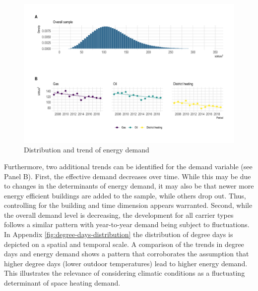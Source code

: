 \documentclass[12pt,twoside]{reedthesis}
\begin{document}
\begin{figure}

{\centering \includegraphics[width=1\linewidth]{figure/demand_descriptive} 

}

\caption{Distribution and trend of energy demand}\label{fig:demand-descriptive-graph}
\end{figure}
Furthermore, two additional trends can be identified for the demand variable (see Panel B). First, the effective demand decreases over time. While this may be due to changes in the determinants of energy demand, it may also be that newer more energy efficient buildings are added to the sample, while others drop out. Thus, controlling for the building and time dimension appears warranted. Second, while the overall demand level is decreasing, the development for all carrier types follows a similar pattern with year-to-year demand being subject to fluctuations. In Appendix \ref{fig:degree-days-distribution} the distribution of degree days is depicted on a spatial and temporal scale. A comparison of the trends in degree days and energy demand shows a pattern that corroborates the assumption that higher degree days (lower outdoor temperatures) lead to higher energy demand. This illustrates the relevance of considering climatic conditions as a fluctuating determinant of space heating demand.
\end{document}
